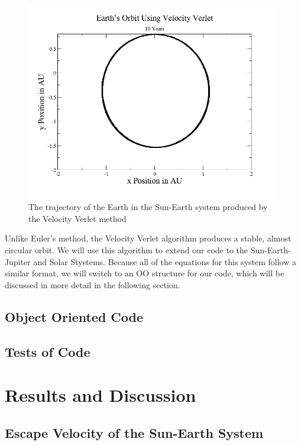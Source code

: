 \documentclass[%
oneside,                 %
final,                   %
10pt]{article}
\begin{document}
\begin{figure}[H]\label{fig:velrplot}
  \centering
    \includegraphics[width=1.0\textwidth]{velverearth.jpg}
    \caption{The trajectory of the Earth in the Sun-Earth system produced by the Velocity Verlet method}
\end{figure}

Unlike Euler's method, the Velocity Verlet algorithm produces a stable, almost circular orbit.  We will use this algorithm to extend our code to the Sun-Earth-Jupiter and Solar Stystems.  Because all of the equations for this system follow a similar format, we will switch to an OO structure for our code, which will be discussed in more detail in the following section. 

\subsection{Object Oriented Code}

\subsection{Tests of Code}

\section{Results and Discussion}


\subsection{Escape Velocity of the Sun-Earth System}
\end{document}
